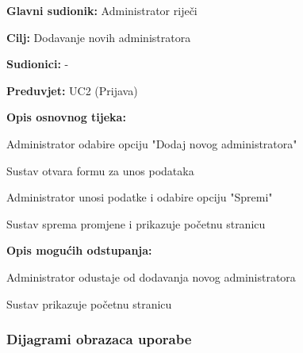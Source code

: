 					\noindent {}
				\begin{packed_item}
					
					\item \textbf{Glavni sudionik: } Administrator riječi
					\item  \textbf{Cilj:} Dodavanje novih administratora
					\item  \textbf{Sudionici:} -
					\item  \textbf{Preduvjet:} UC2 (Prijava)
					\item  \textbf{Opis osnovnog tijeka:}
					
					\item[] \begin{packed_enum}
						
						\item Administrator odabire opciju "Dodaj novog administratora"
						\item Sustav otvara formu za unos podataka
						\item Administrator unosi podatke i odabire opciju "Spremi"
						\item Sustav sprema promjene i prikazuje početnu stranicu
					\end{packed_enum}
					
					\item  \textbf{Opis mogućih odstupanja:}
					
					\item[] \begin{packed_item}
						
						\item[3.a] Administrator odustaje od dodavanja novog administratora
						\item[] \begin{packed_enum}
							
							\item Sustav prikazuje početnu stranicu
							
						\end{packed_enum}
						
					\end{packed_item}
				\end{packed_item}
				
				
					
				\subsubsection{Dijagrami obrazaca uporabe}
					
